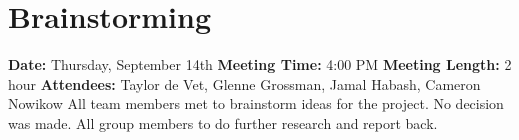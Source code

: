 \section{Brainstorming}
\textbf{Date:} Thursday, September 14th
\newline
\textbf{Meeting Time:} 4:00 PM
\newline
\textbf{Meeting Length:} 2 hour
\newline
\textbf{Attendees:} Taylor de Vet, Glenne Grossman, Jamal Habash, Cameron Nowikow
\newline
\newline
All team members met to brainstorm ideas for the project. No decision was made.
All group members to do further research and report back.
